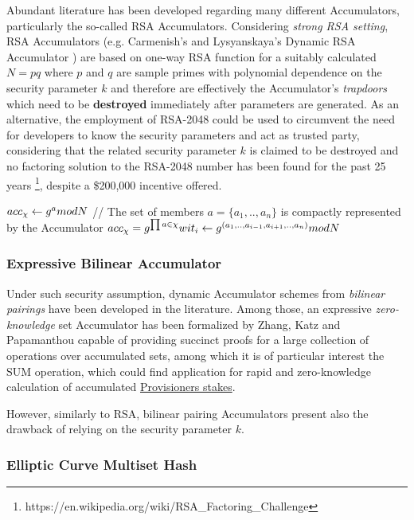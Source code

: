 Abundant literature has been developed regarding many different Accumulators, particularly the so-called RSA Accumulators. Considering \textit{strong RSA setting}, RSA Accumulators (e.g. Carmenish's and Lysyanskaya's Dynamic RSA Accumulator \cite{accumulators}) are based on one-way RSA function for a suitably calculated $N =pq$ where $p$ and $q$ are sample primes with polynomial dependence on the security parameter $k$ and therefore are effectively the Accumulator's \textit{trapdoors} which need to be \textbf{destroyed} immediately after parameters are generated. As an alternative, the employment of RSA-2048 could be used to circumvent the need for developers to know the security parameters and act as trusted party, considering that the related security parameter $k$ is claimed to be destroyed and no factoring solution to the RSA-2048 number has been found for the past 25 years \footnote{https://en.wikipedia.org/wiki/RSA\_Factoring\_Challenge}, despite a \$200,000 incentive offered.

$acc_\chi \leftarrow g^{a} mod\space N$ // The set of members $a =\{a_1, .., a_n\}$ is compactly represented by the Accumulator
$acc_\chi = g^{\prod{a \in \chi}}\\wit_i \leftarrow g^{(a_1, .., a_{i-1}, a_{i+1}, .., a_n)} mod\space N$

\subsubsection{Expressive Bilinear Accumulator}

Under such security assumption, dynamic Accumulator schemes from \textit{bilinear pairings} have been developed in the literature. Among those, an expressive \textit{zero-knowledge} set Accumulator has been formalized by Zhang, Katz and Papamanthou \cite{zeroaccum} capable of providing succinct proofs for a large collection of operations over accumulated sets, among which it is of particular interest the $\textrm{SUM}$ operation, which could find application for rapid and zero-knowledge calculation of accumulated \hyperref[sec:Cryptographically-Committed-Provisioners]{Provisioners stakes}.

However, similarly to RSA, bilinear pairing Accumulators present also the drawback of relying on the security parameter $k$.

\subsubsection{Elliptic Curve Multiset Hash}

